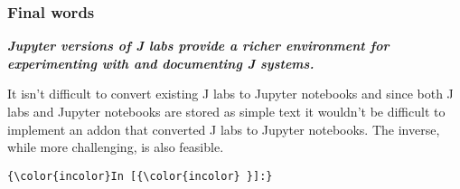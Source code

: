 \documentclass[11pt,letter,landscape]{article}
\begin{document}
    
    
    \subsubsection{Final words}\label{final-words}

\textbf{\emph{Jupyter versions of J labs provide a richer environment
for experimenting with and documenting J systems.}}

It isn't difficult to convert existing J labs to Jupyter notebooks and
since both J labs and Jupyter notebooks are stored as simple text it
wouldn't be difficult to implement an addon that converted J labs to
Jupyter notebooks. The inverse, while more challenging, is also
feasible.

    \begin{Verbatim}[commandchars=\\\{\}]
{\color{incolor}In [{\color{incolor} }]:} 
\end{Verbatim}


    
    
    
    
\end{document}
